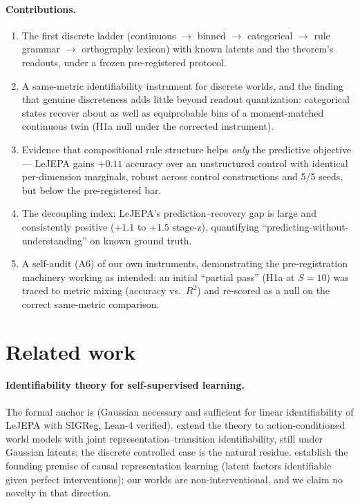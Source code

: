 \documentclass[10pt]{article}
\begin{document}
\paragraph{Contributions.}
\begin{enumerate}[leftmargin=*,itemsep=1pt]
\item The first discrete ladder (continuous $\to$ binned $\to$ categorical
$\to$ rule grammar $\to$ orthography lexicon) with known latents and the
theorem's readouts, under a frozen pre-registered protocol.
\item A same-metric identifiability instrument for discrete worlds, and the
finding that genuine discreteness adds little beyond readout quantization:
categorical states recover about as well as equiprobable bins of a
moment-matched continuous twin (H1a null under the corrected instrument).
\item Evidence that compositional rule structure helps \emph{only} the
predictive objective --- LeJEPA gains $+0.11$ accuracy over an unstructured
control with identical per-dimension marginals, robust across control
constructions and 5/5 seeds, but below the pre-registered bar.
\item The decoupling index: LeJEPA's prediction--recovery gap is large and
consistently positive ($+1.1$ to $+1.5$ stage-z), quantifying
``predicting-without-understanding'' on known ground truth.
\item A self-audit (A6) of our own instruments, demonstrating the
pre-registration machinery working as intended: an initial ``partial pass''
(H1a at $S{=}10$) was traced to metric mixing (accuracy vs.\ $R^2$) and
re-scored as a null on the correct same-metric comparison.
\end{enumerate}

\section{Related work}
\label{sec:related}
\paragraph{Identifiability theory for self-supervised learning.}
The formal anchor is \citet{klindt2026lejepa} (Gaussian necessary and
sufficient for linear identifiability of LeJEPA with SIGReg, Lean-4 verified).
\citet{controlledWM2026} extend the theory to action-conditioned world models
with joint representation--transition identifiability, still under Gaussian
latents; the discrete controlled case is the natural residue.
\citet{interventionalCRL2022} establish the founding premise of causal
representation learning (latent factors identifiable given perfect
interventions); our worlds are non-interventional, and we claim no novelty in
that direction.
\end{document}
